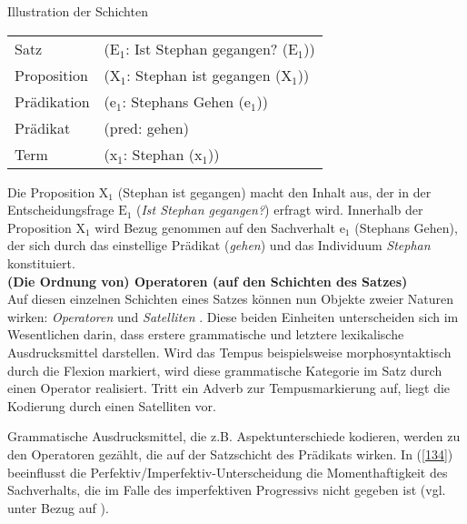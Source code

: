 \begin{exe}
	\ex\label{133}
	Illustration der Schichten\\
	\begin{tabular}[t]{ll}
  	Satz & ($\textrm{E}_{\textrm{1}}$: Ist Stephan gegangen? ($\textrm{E}_{\textrm{1}}$))\\
  	Proposition & ($\textrm{X}_{\textrm{1}}$: Stephan ist gegangen ($\textrm{X}_{\textrm{1}}$))\\
  	Prädikation & ($\textrm{e}_{\textrm{1}}$: Stephans Gehen ($\textrm{e}_{\textrm{1}}$))\\
	Prädikat & (pred: gehen)\\
	Term & ($\textrm{x}_{\textrm{1}}$: Stephan ($\textrm{x}_{\textrm{1}}$))\\  	
\end{tabular}
\end{exe}
Die Proposition $\textrm{X}_{\textrm{1}}$ (\glq Stephan ist gegangen\grq {}) macht den Inhalt aus, der in der Entscheidungsfrage $\textrm{E}_{\textrm{1}}$ (\textit{Ist Stephan gegangen?}) erfragt wird. Innerhalb der Proposition $\textrm{X}_{\textrm{1}}$ wird Bezug genommen auf den Sachverhalt $\textrm{e}_{\textrm{1}}$ (\glq Stephans Gehen\grq {}), der sich durch das einstellige Prädikat (\textit{gehen}) und das Individuum \textit{Stephan} konstituiert.\\
\newline
\noindent
\textbf{(Die Ordnung von) Operatoren (auf den Schichten des Satzes)}\\
\noindent
Auf diesen einzelnen Schichten eines Satzes können nun Objekte zweier Naturen wirken: \textit{Operatoren}  und \textit{Satelliten} . Diese beiden Einheiten unterscheiden sich im Wesentlichen darin, dass erstere grammatische und letztere lexikalische Ausdrucksmittel darstellen. Wird das Tempus beispielsweise morphosyntaktisch durch die Flexion markiert, wird diese grammatische Kategorie im Satz durch einen Operator realisiert. Tritt ein Adverb zur Tempusmarkierung auf, liegt die Kodierung durch einen Satelliten vor.

Grammatische Ausdrucksmittel, die z.B. Aspektunterschiede kodieren, werden zu den Operatoren gezählt, die auf der Satzschicht des Prädikats wirken. In (\ref{134}) beeinflusst die Perfektiv/Imperfektiv-Unterscheidung die Momenthaftigkeit des Sachverhalts, die im Falle des imperfektiven Progressivs nicht gegeben ist (vgl. \citealt[134]{Hengeveld1989} unter Bezug auf \citealt[43]{Comrie1976}). 

